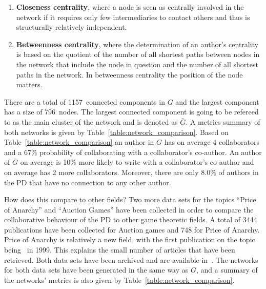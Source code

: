 \documentclass{article}
\theoremstyle{definition}
\newcommand{\isolatedpercentage}{8.0}
\newcommand{\connectedcomponents}{1157}
\newcommand{\largestcc}{796}
\begin{document}
\begin{enumerate}
    \item \textbf{Closeness centrality}, where a node
    is seen as centrally involved in the network if it requires only few
    intermediaries to contact others and thus is structurally relatively
    independent.
    \item \textbf{Betweenness centrality},
    where the determination of an author's centrality is based on the quotient
    of the number of all shortest paths between nodes in the network that
    include the node in question and the number of all shortest paths in the
    network. In betweenness centrality the position of the node matters.
\end{enumerate}

There are a total of
\connectedcomponents~connected components in \(G\) and the largest component has
a size of \largestcc~nodes. The largest connected component is going to be
refereed to as the main cluster of the network and is denoted as \(\bar{G}\). A
metrics summary of both networks is given
by Table~\ref{table:network_comparison}.
Based on Table~\ref{table:network_comparison} an author in \(G\) has on
average 4 collaborators and a 67\% probability of collaborating with a
collaborator's co-author. An author of \(\bar{G}\) on average is 10\% more likely
to write with a collaborator's co-author and on average has 2 more
collaborators. Moreover, there are only \isolatedpercentage\% of authors in the
PD that have no connection to any other author.

How does this compare to other fields? Two more data sets for the topics
``Price of Anarchy'' and ``Auction Games'' have been collected in order to
compare the collaborative behaviour of the PD to other game theoretic fields. A
total of 3444 publications have been collected for Auction games and 748 for
Price of Anarchy. Price of Anarchy is relatively a new field, with the first
publication on the topic being~\cite{Koutsoupias1999} in 1999. This explains the
small number of articles that have been retrieved. Both data sets have been
archived and are available in~\cite{auction_data_2018, anarchy_data_2018}.
The networks for both data sets have been generated in the same way as \(G\),
and a summary of the networks' metrics is also given by Table~\ref{table:network_comparison}.
\end{document}
